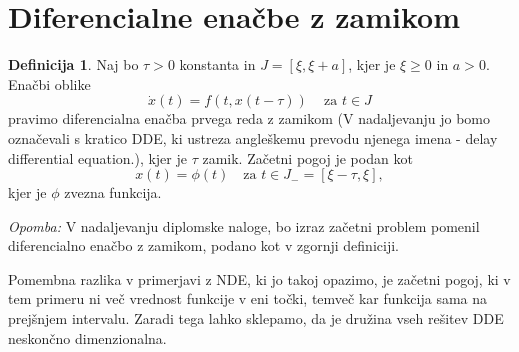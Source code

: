 \documentclass[12pt,a4paper]{amsart}
\theoremstyle{definition} %
\newtheorem{definicija}{Definicija}[section]
\theoremstyle{plain} %
\begin{document}
\newpage

\section{Diferencialne enačbe z zamikom}

\begin{definicija}
    Naj bo $\tau > 0$ konstanta in $J = [\xi,\xi +a]$, kjer je $\xi \geq 0$ in $a > 0$. Enačbi oblike
    \[\dot{x}(t)=f(t,x(t-\tau))\, \quad \text{za } t \in J\]
    pravimo diferencialna enačba prvega reda z zamikom (V nadaljevanju jo bomo 
    označevali s kratico DDE, ki ustreza angleškemu prevodu njenega imena - 
    delay differential equation.), kjer je $\tau$ zamik.
    Začetni pogoj je podan kot
    \[x(t)=\phi(t) \quad \text{za } t \in J_{-} = [\xi-\tau,\xi],\]kjer je $\phi$ zvezna funkcija.
\end{definicija}

\noindent\textit{Opomba:} V nadaljevanju diplomske naloge, bo izraz začetni problem pomenil diferencialno enačbo z zamikom, podano kot v 
zgornji definiciji.

Pomembna razlika v primerjavi z NDE, ki jo takoj opazimo, je začetni pogoj, ki v tem primeru ni več vrednost 
funkcije v eni točki, temveč kar funkcija sama na prejšnjem intervalu. Zaradi tega lahko sklepamo, da je družina vseh rešitev DDE neskončno
dimenzionalna.
\end{document}
